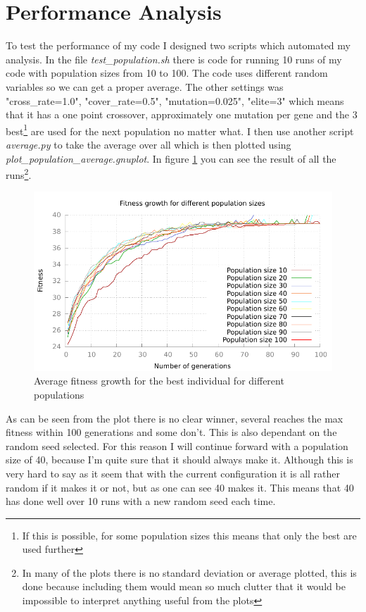 \section{Performance Analysis}\label{sec:performance analysis}
To test the performance of my code I designed two scripts which automated my
analysis. In the file \textit{test\_population.sh} there is code for running 10
runs of my code with population sizes from 10 to 100. The code uses different
random variables so we can get a proper average. The other settings was
"cross\_rate=1.0", "cover\_rate=0.5", "mutation=0.025", "elite=3" which means that it has a one point
crossover, approximately one mutation per gene and the 3 best\footnote{If this is
possible, for some population sizes this means that only the best are used
further} are used for the next population no matter what. I then use another script
\textit{average.py} to take the average over all which is then plotted using
\textit{plot\_population\_average.gnuplot}. In figure
\ref{fig:population-average} you can see the result of all the runs\footnote{In
	many of the plots there is no standard deviation or average plotted,
	this is done because including them would mean so much clutter that it
would be impossible to interpret anything useful from the plots}.

\begin{figure}[h!]
	\includegraphics{../graphs/fitness_population_average.pdf}
	\caption{Average fitness growth for the best individual for different populations}
	\label{fig:population-average}
\end{figure}

As can be seen from the plot there is no clear winner, several reaches the max
fitness within 100 generations and some don't. This is also dependant on the
random seed selected. For this reason I will continue forward with a population
size of 40, because I'm quite sure that it should always make it. Although this
is very hard to say as it seem that with the current configuration it is all
rather random if it makes it or not, but as one can see 40 makes it. This means
that 40 has done well over 10 runs with a new random seed each time.

